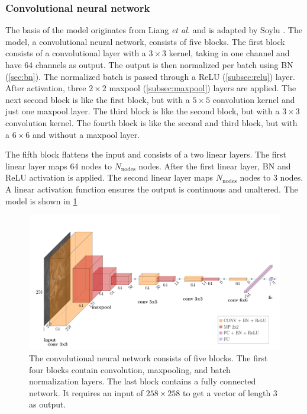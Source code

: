 \subsubsection{Convolutional neural network}
The basis of the model originates from Liang \emph{et al.}  and is adapted by Soylu .
The model, a convolutional neural network, consists of five blocks.
The first block consists of a convolutional layer with a $3\times3$ kernel, taking in one channel and have 64 channels as output.
The output is then normalized per batch using BN (\cref{sec:bn}).
The normalized batch is passed through a ReLU (\cref{subsec:relu}) layer.
After activation, three $2\times2$ maxpool (\cref{subsec:maxpool}) layers are applied.
The next second block is like the first block, but with a $5\times5$ convolution kernel and just one maxpool layer.
The third block is like the second block, but with a $3\times3$ convolution kernel.
The fourth block is like the second and third block, but with a $6\times6$ and without a maxpool layer.

The fifth block flattens the input and consists of a two linear layers.
The first linear layer maps 64 nodes to $N_\mathrm{nodes}$ nodes.
After the first linear layer, BN and ReLU activation is applied.
The second linear layer maps $N_\mathrm{nodes}$ nodes to 3 nodes.
A linear activation function ensures the output is continuous and unaltered.
The model is shown in \cref{fig:model}

\begin{figure}
    \includegraphics{skinstression/images/skinstression.pdf}
    \caption[Network architecture]{
        The convolutional neural network consists of five blocks.
        The first four blocks contain convolution, maxpooling, and batch normalization layers.
        The last block contains a fully connected network.
        It requires an input of $258\times258$ to get a vector of length 3 as output.
    }
    \label{fig:model}
\end{figure}

